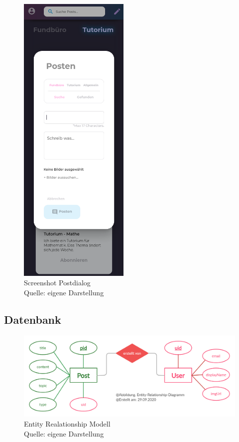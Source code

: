 \documentclass[12pt,titlepage]{article}
\begin{document}
\begin{figure}[hbt!]
\centering
\includegraphics[width=150pt]{screenshots/Screenshot_Mobil_Posten.png}
\caption[Sreenshot Postdialog]{Screenshot Postdialog\\Quelle: eigene Darstellung}
\end{figure}

\FloatBarrier

\subsection{Datenbank}

\begin{figure}[!htb]
\centering
\includegraphics[width=400pt]{abbildungen/Abbildung_ERM.png}
\caption[ERM]{Entity Realationship Modell \\Quelle: eigene Darstellung}
\end{figure}
\end{document}
